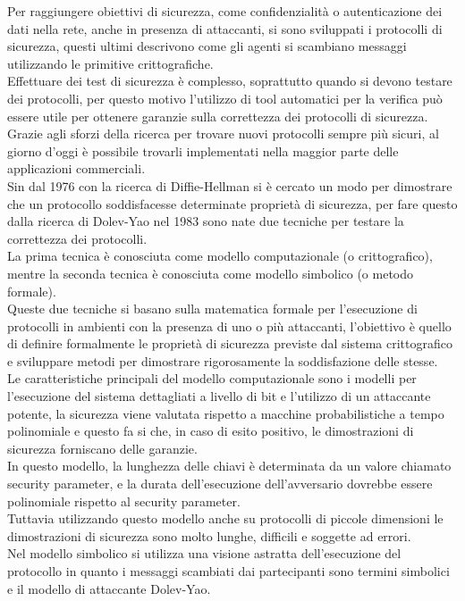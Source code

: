 \noindent Per raggiungere obiettivi di sicurezza, come confidenzialità o autenticazione dei dati nella rete, anche in presenza di attaccanti, si sono sviluppati i protocolli di sicurezza, questi ultimi descrivono come gli agenti si scambiano messaggi utilizzando le primitive crittografiche.\\
Effettuare dei test di sicurezza è complesso, soprattutto quando si devono testare dei protocolli, per questo motivo l'utilizzo di tool automatici per la verifica può essere utile per ottenere garanzie sulla correttezza dei protocolli di sicurezza.\\
Grazie agli sforzi della ricerca per trovare nuovi protocolli sempre più sicuri, al giorno d'oggi è possibile trovarli implementati nella maggior parte delle applicazioni commerciali.\\ 
Sin dal 1976 con la ricerca di Diffie-Hellman si è cercato un modo per dimostrare che un protocollo soddisfacesse determinate proprietà di sicurezza, per fare questo dalla ricerca di Dolev-Yao nel 1983 sono nate due tecniche per testare la correttezza dei protocolli.\\
La prima tecnica è conosciuta come modello computazionale (o crittografico), mentre la seconda tecnica è conosciuta come modello simbolico (o metodo formale).\\
Queste due tecniche si basano sulla matematica formale per l'esecuzione di protocolli in ambienti con la presenza di uno o più attaccanti, l'obiettivo è quello di definire formalmente le proprietà di sicurezza previste dal sistema crittografico e sviluppare metodi per dimostrare rigorosamente la soddisfazione delle stesse.\\
Le caratteristiche principali del modello computazionale sono i modelli per l'esecuzione del sistema dettagliati a livello di bit e l'utilizzo di un attaccante potente, la sicurezza viene valutata rispetto a macchine probabilistiche a tempo polinomiale e questo fa si che, in caso di esito positivo, le dimostrazioni di sicurezza forniscano delle garanzie.\\
In questo modello, la lunghezza delle chiavi è determinata da un valore chiamato security parameter, e la durata dell'esecuzione dell'avversario dovrebbe essere polinomiale rispetto al security parameter.\\
Tuttavia utilizzando questo modello anche su protocolli di piccole dimensioni le dimostrazioni di sicurezza sono molto lunghe, difficili e soggette ad errori.\\
Nel modello simbolico si utilizza una visione astratta dell'esecuzione del protocollo in quanto i messaggi scambiati dai partecipanti sono termini simbolici e il modello di attaccante Dolev-Yao.\\
